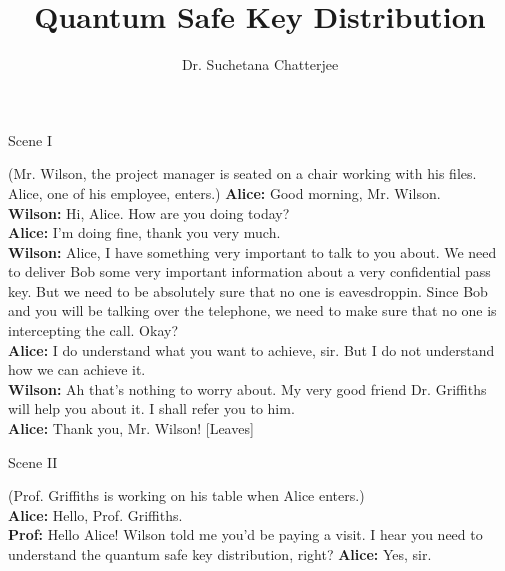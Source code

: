 \documentclass[12pt]{article}
\title{Quantum Safe Key Distribution}
\author{Dr. Suchetana Chatterjee}
\newcommand\tbf[1]{\textbf{#1}}
\begin{document}
\maketitle
\begin{enumerate}[1.]
\begin{center}
\large{Scene I}
\end{center}

{(Mr. Wilson, the project manager is seated on a chair working with his files. Alice, one of his employee, enters.)} \newline
\tbf{Alice:} Good morning, Mr. Wilson. \\ \newline
\tbf{Wilson:} Hi, Alice. How are you doing today? \\ \newline
\tbf{Alice:}	I'm doing fine, thank you very much. \\ \newline
\tbf{Wilson:} Alice, I have something very important to talk to you about. We need to deliver Bob some very important information about a very confidential pass key. But we need to be absolutely sure that no one is eavesdroppin. Since Bob and you will be talking over the telephone, we need to make sure that no one is intercepting the call. Okay? \\ \newline
\tbf{Alice:} I do understand what you want to achieve, sir. But I do not understand how we can achieve it. \\ \newline
\tbf{Wilson:} Ah that's nothing to worry about. My very good friend Dr. Griffiths will help you about it. I shall refer you to him. \\ \newline
\tbf{Alice:} Thank you, Mr. Wilson! [Leaves] \\ \newline
\newpage
\begin{center}
\large{Scene II}
\end{center}
(Prof. Griffiths is working on his table when Alice enters.)\\ \newline %
\tbf{Alice:} Hello, Prof. Griffiths. \\ \newline
\tbf{Prof:} Hello Alice! Wilson told me you'd be paying a visit. I hear you need to understand the quantum safe key distribution, right? \newline
\tbf{Alice:} Yes, sir. \newline

\end{enumerate}
\end{document}

